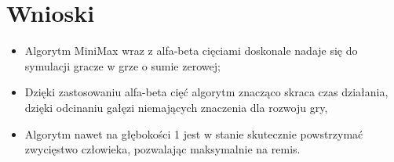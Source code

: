 \documentclass[12pt]{article}
\begin{document}
            \section{Wnioski}
            \begin{itemize}
                \item Algorytm MiniMax wraz z alfa-beta cięciami doskonale nadaje się do symulacji gracze w grze o sumie zerowej;
                \item Dzięki zastosowaniu alfa-beta cięć algorytm znacząco skraca czas działania, dzięki odcinaniu gałęzi niemających znaczenia dla rozwoju gry,
                \item Algorytm nawet na głębokości 1 jest w stanie skutecznie powstrzymać zwycięstwo człowieka, pozwalając maksymalnie na remis.
            \end{itemize}
\end{document}
